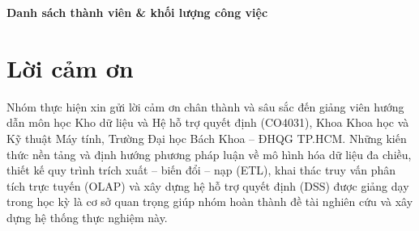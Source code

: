 \documentclass[a4paper, 12pt]{article}
\begin{document}
\newpage
\begin{center}
    \Large{\textbf{Danh sách thành viên \& khối lượng công việc}}
\end{center}
\begin{table}[h]
    \centering
    \renewcommand{\arraystretch}{1.3} %
\end{table}
\newpage

\section*{Lời cảm ơn}
Nhóm thực hiện xin gửi lời cảm ơn chân thành và sâu sắc đến giảng viên hướng dẫn môn học Kho dữ liệu và Hệ hỗ trợ quyết định (CO4031), Khoa Khoa học và Kỹ thuật Máy tính, Trường Đại học Bách Khoa -- ĐHQG TP.HCM. Những kiến thức nền tảng và định hướng phương pháp luận về mô hình hóa dữ liệu đa chiều, thiết kế quy trình trích xuất -- biến đổi -- nạp (ETL), khai thác truy vấn phân tích trực tuyến (OLAP) và xây dựng hệ hỗ trợ quyết định (DSS) được giảng dạy trong học kỳ là cơ sở quan trọng giúp nhóm hoàn thành đề tài nghiên cứu và xây dựng hệ thống thực nghiệm này.

\newpage
\end{document}

